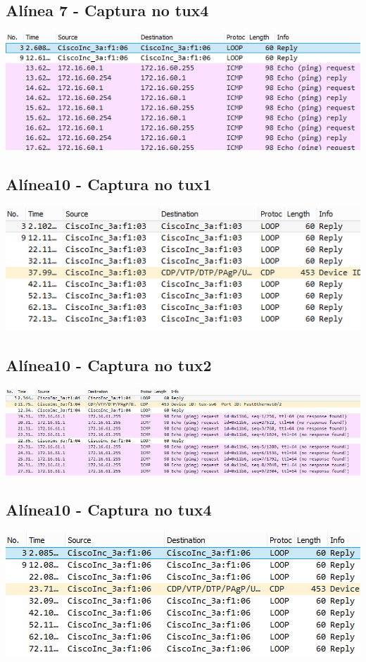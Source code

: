 \documentclass[11pt,a4paper,reqno]{report}
\numberwithin{equation}{section}
\begin{document}
\begin{appendices}
\subsection{Alínea 7 - Captura no tux4}
\label{ex2_tux1ping_tux4}
\includegraphics[width=16cm]{ex2_a7_tux4.png}

\subsection{Alínea10 - Captura no tux1}
\includegraphics[width=16cm]{ex2_a10_tux1.png}
\subsection{Alínea10 - Captura no tux2}
\includegraphics[width=16cm]{ex2_a10_tux2.png}
\subsection{Alínea10 - Captura no tux4}
\includegraphics[width=16cm]{ex2_a10_tux4.png}


\end{appendices}
\end{document}
